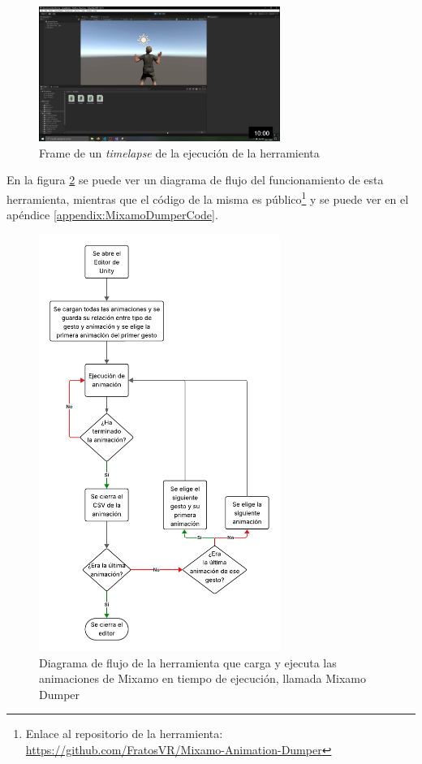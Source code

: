 \begin{figure}[H]
    \centering
    \includegraphics[width=0.7\textwidth]{Imagenes/Bitmap/remy_bailon.png}
    \caption{Frame de un \textit{timelapse} de la ejecución de la herramienta}
    \label{fig:frame-timelapse}
\end{figure}

En la figura \ref{fig:MixamoDumper} se puede ver un diagrama de flujo del funcionamiento de esta herramienta, mientras que el código de la misma es público\footnote{Enlace al repositorio de la herramienta: \url{https://github.com/FratosVR/Mixamo-Animation-Dumper}} y se puede ver en el apéndice \ref{appendix:MixamoDumperCode}.

\newpage

\begin{figure}[H]
    \centering
    \includegraphics[width=0.7\textwidth]{Imagenes/Vectorial/FlujoMixamoDumper.pdf}
    \caption{Diagrama de flujo de la herramienta que carga y ejecuta las animaciones de Mixamo en tiempo de ejecución, llamada Mixamo Dumper}
    \label{fig:MixamoDumper}
\end{figure}

